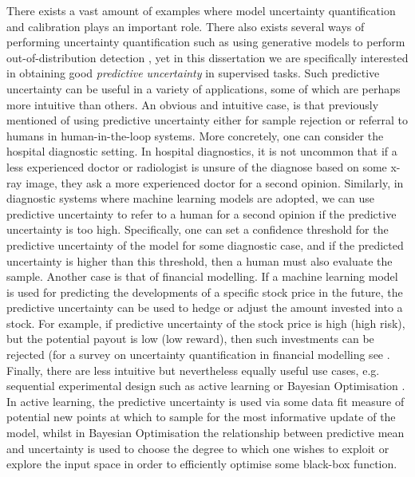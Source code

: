 \noindent There exists a vast amount of examples where model uncertainty quantification and calibration plays an important role. There also exists several ways of performing uncertainty quantification such as using generative models to perform out-of-distribution detection \citep{2019_nalisnickooddetection, 2021_hiervaesood, 2022_bergaminood}, yet in this dissertation we are specifically interested in obtaining good \textit{predictive uncertainty} in supervised tasks. Such predictive uncertainty can be useful in a variety of applications, some of which are perhaps more intuitive than others. An obvious and intuitive case, is that previously mentioned of using predictive uncertainty either for sample rejection or referral to humans in human-in-the-loop systems. More concretely, one can consider the hospital diagnostic setting. In hospital diagnostics, it is not uncommon that if a less experienced doctor or radiologist is unsure of the diagnose based on some x-ray image, they ask a more experienced doctor for a second opinion. Similarly, in diagnostic systems where machine learning models are adopted, we can use predictive uncertainty to refer to a human for a second opinion if the predictive uncertainty is too high. Specifically, one can set a confidence threshold for the predictive uncertainty of the model for some diagnostic case, and if the predicted uncertainty is higher than this threshold, then a human must also evaluate the sample. Another case is that of financial modelling. If a machine learning model is used for predicting the developments of a specific stock price in the future, the predictive uncertainty can be used to hedge or adjust the amount invested into a stock. For example, if predictive uncertainty of the stock price is high (high risk), but the potential payout is low (low reward), then such investments can be rejected (for a survey on uncertainty quantification in financial modelling see \citep{2024_financialmodelling}. Finally, there are less intuitive but nevertheless equally useful use cases, e.g. sequential experimental design such as active learning \citep{1994_activelearning} or Bayesian Optimisation \citep{2001_BO, 2012_BO}. In active learning, the predictive uncertainty is used via some data fit measure of potential new points at which to sample for the most informative update of the model, whilst in Bayesian Optimisation the relationship between predictive mean and uncertainty is used to choose the degree to which one wishes to exploit or explore the input space in order to efficiently optimise some black-box function. \\

